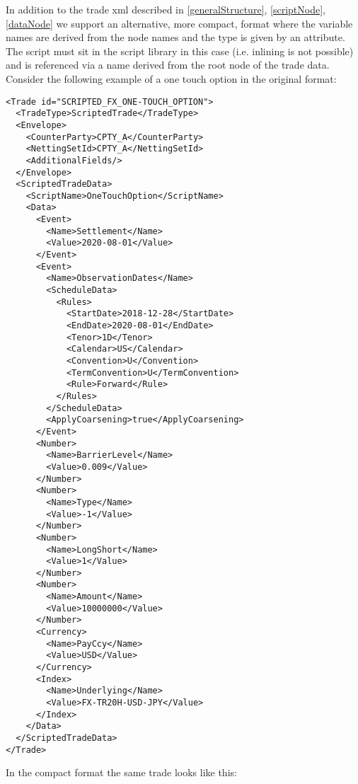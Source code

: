 In addition to the trade xml described in \ref{generalStructure},
\ifdefined\STModuleDoc
\ref{scriptNode}, \ref{dataNode}
\fi
we support an alternative, more compact, format where the variable names are derived from the node names and the type is given by an
attribute. The script
\ifdefined\STModuleDoc
must sit in the script library in this case (i.e. inlining is not possible) and
\fi
is referenced via a name derived from the root node of the trade data. Consider the following example of a one touch option in the
original format:

\begin{verbatim}
<Trade id="SCRIPTED_FX_ONE-TOUCH_OPTION">
  <TradeType>ScriptedTrade</TradeType>
  <Envelope>
    <CounterParty>CPTY_A</CounterParty>
    <NettingSetId>CPTY_A</NettingSetId>
    <AdditionalFields/>
  </Envelope>
  <ScriptedTradeData>
    <ScriptName>OneTouchOption</ScriptName>
    <Data>
      <Event>
        <Name>Settlement</Name>
        <Value>2020-08-01</Value>
      </Event>
      <Event>
        <Name>ObservationDates</Name>
        <ScheduleData>
          <Rules>
            <StartDate>2018-12-28</StartDate>
            <EndDate>2020-08-01</EndDate>
            <Tenor>1D</Tenor>
            <Calendar>US</Calendar>
            <Convention>U</Convention>
            <TermConvention>U</TermConvention>
            <Rule>Forward</Rule>
          </Rules>
        </ScheduleData>
        <ApplyCoarsening>true</ApplyCoarsening>
      </Event>
      <Number>
        <Name>BarrierLevel</Name>
        <Value>0.009</Value>
      </Number>
      <Number>
        <Name>Type</Name>
        <Value>-1</Value>
      </Number>
      <Number>
        <Name>LongShort</Name>
        <Value>1</Value>
      </Number>
      <Number>
        <Name>Amount</Name>
        <Value>10000000</Value>
      </Number>
      <Currency>
        <Name>PayCcy</Name>
        <Value>USD</Value>
      </Currency>
      <Index>
        <Name>Underlying</Name>
        <Value>FX-TR20H-USD-JPY</Value>
      </Index>
    </Data>
  </ScriptedTradeData>
</Trade>
\end{verbatim}

In the compact format the same trade looks like this:

